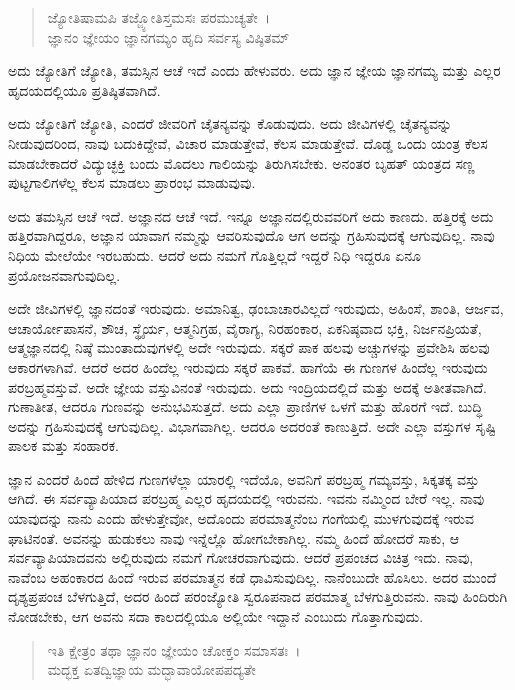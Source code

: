 \begin{verse}
ಜ್ಯೋತಿಷಾಮಪಿ ತಜ್ಜ್ಯೋತಿಸ್ತಮಸಃ ಪರಮುಚ್ಯತೇ~।\\ಜ್ಞಾನಂ ಜ್ಞೇಯಂ ಜ್ಞಾನಗಮ್ಯಂ ಹೃದಿ ಸರ್ವಸ್ಯ ವಿಷ್ಠಿತಮ್ 
\end{verse}

{\small ಅದು ಜ್ಯೋತಿಗೆ ಜ್ಯೋತಿ, ತಮಸ್ಸಿನ ಆಚೆ ಇದೆ ಎಂದು ಹೇಳುವರು. ಅದು ಜ್ಞಾನ ಜ್ಞೇಯ ಜ್ಞಾನಗಮ್ಯ ಮತ್ತು ಎಲ್ಲರ ಹೃದಯದಲ್ಲಿಯೂ ಪ್ರತಿಷ್ಠಿತವಾಗಿದೆ.}

ಅದು ಜ್ಯೋತಿಗೆ ಜ್ಯೋತಿ, ಎಂದರೆ ಜೀವರಿಗೆ ಚೈತನ್ಯವನ್ನು ಕೊಡುವುದು. ಅದು ಜೀವಿಗಳಲ್ಲಿ ಚೈತನ್ಯವನ್ನು ನೀಡುವುದರಿಂದ, ನಾವು ಬದುಕಿದ್ದೇವೆ, ವಿಚಾರ ಮಾಡುತ್ತೇವೆ, ಕೆಲಸ ಮಾಡುತ್ತೇವೆ. ದೊಡ್ಡ ಒಂದು ಯಂತ್ರ ಕೆಲಸ ಮಾಡಬೇಕಾದರೆ ವಿದ್ಯುಚ್ಛಕ್ತಿ ಬಂದು ಮೊದಲು ಗಾಲಿಯನ್ನು ತಿರುಗಿಸಬೇಕು. ಅನಂತರ ಬೃಹತ್ ಯಂತ್ರದ ಸಣ್ಣ ಪುಟ್ಟಗಾಲಿಗಳೆಲ್ಲ ಕೆಲಸ ಮಾಡಲು ಪ್ರಾರಂಭ ಮಾಡುವುವು.

ಅದು ತಮಸ್ಸಿನ ಆಚೆ ಇದೆ. ಅಜ್ಞಾನದ ಆಚೆ ಇದೆ. ಇನ್ನೂ ಅಜ್ಞಾನದಲ್ಲಿರುವವರಿಗೆ ಅದು ಕಾಣದು. ಹತ್ತಿರಕ್ಕೆ ಅದು ಹತ್ತಿರವಾಗಿದ್ದರೂ, ಅಜ್ಞಾನ ಯಾವಾಗ ನಮ್ಮನ್ನು ಆವರಿಸುವುದೊ ಆಗ ಅದನ್ನು ಗ್ರಹಿಸುವುದಕ್ಕೆ ಆಗುವುದಿಲ್ಲ. ನಾವು ನಿಧಿಯ ಮೇಲೆಯೇ ಇರಬಹುದು. ಆದರೆ ಅದು ನಮಗೆ ಗೊತ್ತಿಲ್ಲದೆ ಇದ್ದರೆ ನಿಧಿ ಇದ್ದರೂ ಏನೂ ಪ್ರಯೋಜನವಾಗುವುದಿಲ್ಲ.

ಅದೇ ಜೀವಿಗಳಲ್ಲಿ ಜ್ಞಾನದಂತೆ ಇರುವುದು. ಅಮಾನಿತ್ವ, ಢಂಬಾಚಾರವಿಲ್ಲದೆ ಇರುವುದು, ಅಹಿಂಸೆ, ಶಾಂತಿ, ಆರ್ಜವ, ಆಚಾರ್ಯೋಪಾಸನೆ, ಶೌಚ, ಸ್ಥೈರ್ಯ, ಆತ್ಮನಿಗ್ರಹ, ವೈರಾಗ್ಯ, ನಿರಹಂಕಾರ, ಏಕನಿಷ್ಠವಾದ ಭಕ್ತಿ, ನಿರ್ಜನಪ್ರಿಯತೆ, ಆತ್ಮಜ್ಞಾನದಲ್ಲಿ ನಿಷ್ಠೆ ಮುಂತಾದುವುಗಳಲ್ಲಿ ಅದೇ ಇರುವುದು. ಸಕ್ಕರೆ ಪಾಕ ಹಲವು ಅಚ್ಚುಗಳನ್ನು ಪ್ರವೇಶಿಸಿ ಹಲವು ಆಕಾರಗಳಾಗಿವೆ. ಆದರೆ ಅದರ ಹಿಂದೆಲ್ಲ ಇರುವುದು ಸಕ್ಕರೆ ಪಾಕವೆ. ಹಾಗೆಯೆ ಈ ಗುಣಗಳ ಹಿಂದೆಲ್ಲ ಇರುವುದು ಪರಬ್ರಹ್ಮವಸ್ತುವೆ. ಅದೇ ಜ್ಞೇಯ ವಸ್ತುವಿನಂತೆ ಇರುವುದು. ಅದು ಇಂದ್ರಿಯದಲ್ಲಿದೆ ಮತ್ತು ಅದಕ್ಕೆ ಅತೀತವಾಗಿದೆ. ಗುಣಾತೀತ, ಆದರೂ ಗುಣವನ್ನು ಅನುಭವಿಸುತ್ತದೆ. ಅದು ಎಲ್ಲಾ ಪ್ರಾಣಿಗಳ ಒಳಗೆ ಮತ್ತು ಹೊರಗೆ ಇದೆ. ಬುದ್ಧಿ ಅದನ್ನು ಗ್ರಹಿಸುವುದಕ್ಕೆ ಆಗುವುದಿಲ್ಲ. ವಿಭಾಗವಾಗಿಲ್ಲ. ಆದರೂ ಅದರಂತೆ ಕಾಣುತ್ತಿದೆ. ಅದೇ ಎಲ್ಲಾ ವಸ್ತುಗಳ ಸೃಷ್ಟಿ ಪಾಲಕ ಮತ್ತು ಸಂಹಾರಕ.

ಜ್ಞಾನ ಎಂದರೆ ಹಿಂದೆ ಹೇಳಿದ ಗುಣಗಳೆಲ್ಲಾ ಯಾರಲ್ಲಿ ಇದೆಯೊ, ಅವನಿಗೆ ಪರಬ್ರಹ್ಮ ಗಮ್ಯವಸ್ತು, ಸಿಕ್ಕತಕ್ಕ ವಸ್ತು ಆಗಿದೆ. ಈ ಸರ್ವವ್ಯಾಪಿಯಾದ ಪರಬ್ರಹ್ಮ ಎಲ್ಲರ ಹೃದಯದಲ್ಲಿ ಇರುವನು. ಇವನು ನಮ್ಮಿಂದ ಬೇರೆ ಇಲ್ಲ. ನಾವು ಯಾವುದನ್ನು ನಾನು ಎಂದು ಹೇಳುತ್ತೇವೋ, ಅದೊಂದು ಪರಮಾತ್ಮನೆಂಬ ಗಂಗೆಯಲ್ಲಿ ಮುಳಗುವುದಕ್ಕೆ ಇರುವ ಘಾಟಿನಂತೆ. ಅವನನ್ನು ಹುಡುಕಲು ನಾವು ಇನ್ನೆಲ್ಲೊ ಹೋಗಬೇಕಾಗಿಲ್ಲ. ನಮ್ಮ ಹಿಂದೆ ಹೋದರೆ ಸಾಕು, ಆ ಸರ್ವವ್ಯಾಪಿಯಾದವನು ಅಲ್ಲಿರುವುದು ನಮಗೆ ಗೋಚರವಾಗುವುದು. ಆದರೆ ಪ್ರಪಂಚದ ವಿಚಿತ್ರ ಇದು. ನಾವು, ನಾವೆಂಬ ಅಹಂಕಾರದ ಹಿಂದೆ ಇರುವ ಪರಮಾತ್ಮನ ಕಡೆ ಧಾವಿಸುವುದಿಲ್ಲ. ನಾನೆಂಬುದೇ ಹೊಸಿಲು. ಅದರ ಮುಂದೆ ದೃಶ್ಯಪ್ರಪಂಚ ಬೆಳಗುತ್ತಿದೆ, ಅದರ ಹಿಂದೆ ಪರಂಜ್ಯೋತಿ ಸ್ವರೂಪನಾದ ಪರಮಾತ್ಮ ಬೆಳಗುತ್ತಿರುವನು. ನಾವು ಹಿಂದಿರುಗಿ ನೋಡಬೇಕು, ಆಗ ಅವನು ಸದಾ ಕಾಲದಲ್ಲಿಯೂ ಅಲ್ಲಿಯೇ ಇದ್ದಾನೆ ಎಂಬುದು ಗೊತ್ತಾಗುವುದು.

\begin{verse}
ಇತಿ ಕ್ಷೇತ್ರಂ ತಥಾ ಜ್ಞಾನಂ ಜ್ಞೇಯಂ ಚೋಕ್ತಂ ಸಮಾಸತಃ~।\\ಮದ್ಭಕ್ತ ಏತದ್ವಿಜ್ಞಾಯ ಮದ್ಭಾವಾಯೋಪಪದ್ಯತೇ 
\end{verse}

